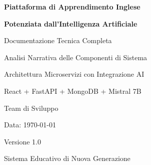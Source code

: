 \documentclass[12pt,a4paper]{article}
\begin{document}
\begin{titlepage}
    \centering
    \vspace*{2cm}
    
    {\huge\bfseries Piattaforma di Apprendimento Inglese\par}
    {\huge\bfseries Potenziata dall'Intelligenza Artificiale\par}
    
    \vspace{1.5cm}
    
    {\Large Documentazione Tecnica Completa\par}
    {\Large Analisi Narrativa delle Componenti di Sistema\par}
    
    \vspace{2cm}
    
    {\large Architettura Microservizi con Integrazione AI\par}
    {\large React + FastAPI + MongoDB + Mistral 7B\par}
    
    \vspace{3cm}
    
    {\large Team di Sviluppo\par}
    {\large Data: \today\par}
    
    \vfill
    
    {\large Versione 1.0\par}
    {\large Sistema Educativo di Nuova Generazione\par}
    
\end{titlepage}

\tableofcontents
\newpage

\begin{abstract}
La presente documentazione descrive in maniera narrativa e dettagliata la Piattaforma di Apprendimento Inglese potenziata dall'Intelligenza Artificiale, un sistema educativo innovativo che combina tecnologie moderne di sviluppo web con algoritmi di machine learning avanzati. Il sistema è progettato secondo un'architettura a microservizi containerizzata, dove ogni componente svolge funzioni specifiche nell'ecosistema educativo. La piattaforma utilizza React per l'interfaccia utente, FastAPI per il backend, MongoDB per la persistenza dei dati e Mistral 7B tramite Ollama per le funzionalità di intelligenza artificiale. L'intero sistema è orchestrato attraverso Docker, garantendo scalabilità, manutenibilità e deployment semplificato. Questa documentazione fornisce una visione completa dell'architettura, delle componenti e delle metodologie implementate per creare un'esperienza di apprendimento personalizzata e adattiva.
\end{abstract}
\end{document}
